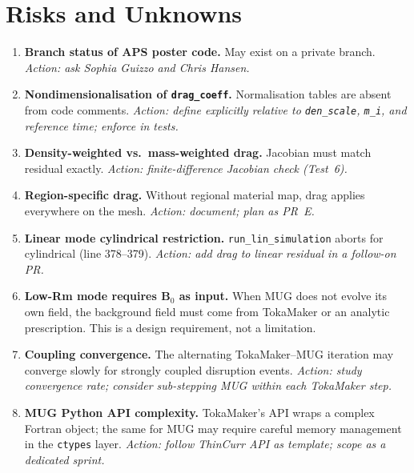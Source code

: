 \documentclass[11pt,letterpaper]{article}
\begin{document}
\section{Risks and Unknowns}

\begin{enumerate}[label=\textbf{R\arabic*.}]
  \item \textbf{Branch status of APS poster code.} May exist on a private branch.
    \textit{Action: ask Sophia Guizzo and Chris Hansen.}

  \item \textbf{Nondimensionalisation of \texttt{drag\_coeff}.} Normalisation
    tables are absent from code comments.
    \textit{Action: define explicitly relative to \texttt{den\_scale}, \texttt{m\_i},
    and reference time; enforce in tests.}

  \item \textbf{Density-weighted vs.\ mass-weighted drag.} Jacobian must match
    residual exactly.
    \textit{Action: finite-difference Jacobian check (Test~6).}

  \item \textbf{Region-specific drag.} Without regional material map, drag
    applies everywhere on the mesh.
    \textit{Action: document; plan as PR~E.}

  \item \textbf{Linear mode cylindrical restriction.} \texttt{run\_lin\_simulation}
    aborts for cylindrical (line 378--379).
    \textit{Action: add drag to linear residual in a follow-on PR.}

  \item \textbf{Low-Rm mode requires $\mathbf{B}_0$ as input.} When MUG does
    not evolve its own field, the background field must come from TokaMaker or
    an analytic prescription.  This is a design requirement, not a limitation.

  \item \textbf{Coupling convergence.} The alternating TokaMaker--MUG iteration
    may converge slowly for strongly coupled disruption events.
    \textit{Action: study convergence rate; consider sub-stepping MUG within each
    TokaMaker step.}

  \item \textbf{MUG Python API complexity.} TokaMaker's API wraps a complex
    Fortran object; the same for MUG may require careful memory management in
    the \texttt{ctypes} layer.
    \textit{Action: follow ThinCurr API as template; scope as a dedicated sprint.}
\end{enumerate}
\end{document}
